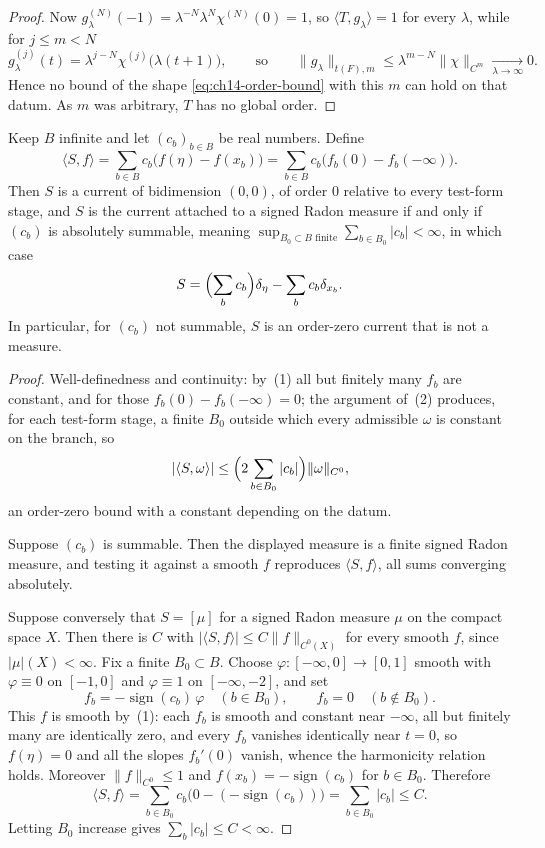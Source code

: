\begin{proof}
Now $g_\lambda^{(N)}(-1)=\lambda^{-N}\lambda^{N}\chi^{(N)}(0)=1$, so
$\langle T,g_\lambda\rangle=1$ for every $\lambda$, while for $j\le m<N$
\[
 g_\lambda^{(j)}(t)=\lambda^{j-N}\chi^{(j)}\bigl(\lambda(t+1)\bigr),
 \qquad\text{so}\qquad
 \|g_\lambda\|_{t(F),m}\le\lambda^{m-N}\|\chi\|_{C^m}
 \xrightarrow[\lambda\to\infty]{}0 .
\]
Hence no bound of the shape \eqref{eq:ch14-order-bound} with this $m$ can
hold on that datum.  As $m$ was arbitrary, $T$ has no global order.
\end{proof}

\begin{example}
\label{ex:ch14-star-not-measure}
Keep $B$ infinite and let $(c_b)_{b\in B}$ be real numbers.  Define
\[
 \langle S,f\rangle=\sum_{b\in B}c_b\bigl(f(\eta)-f(x_b)\bigr)
 =\sum_{b\in B}c_b\bigl(f_b(0)-f_b(-\infty)\bigr).
\]
Then $S$ is a current of bidimension $(0,0)$, of order $0$ relative to every
test-form stage, and $S$ is the current attached to a signed Radon measure if
and only if $(c_b)$ is absolutely summable, meaning
$\sup_{B_0\subset B\text{ finite}}\sum_{b\in B_0}|c_b|<\infty$,
in which case
\[
 S=\Bigl(\sum_bc_b\Bigr)\delta_\eta-\sum_bc_b\delta_{x_b}.
\]
In particular, for $(c_b)$ not summable, $S$ is an order-zero current that is
not a measure.
\end{example}

\begin{proof}
Well-definedness and continuity: by \,(1) all but
finitely many $f_b$ are constant, and for those
$f_b(0)-f_b(-\infty)=0$; the argument of
\,(2) produces, for each test-form stage, a
finite $B_0$ outside which every admissible $\omega$ is constant on the
branch, so
\[
 |\langle S,\omega\rangle|
 \le\Bigl(2\sum_{b\in B_0}|c_b|\Bigr)\|\omega\|_{C^0},
\]
an order-zero bound with a constant depending on the datum.

Suppose $(c_b)$ is summable.  Then the displayed measure is a finite signed
Radon measure, and testing it against a smooth $f$ reproduces
$\langle S,f\rangle$, all sums converging absolutely.

Suppose conversely that $S=[\mu]$ for a signed Radon measure $\mu$ on the
compact space $X$.  Then there is $C$ with $|\langle S,f\rangle|\le
C\|f\|_{C^0(X)}$ for every smooth $f$, since $|\mu|(X)<\infty$.  Fix a finite
$B_0\subset B$.  Choose $\varphi:[-\infty,0]\to[0,1]$ smooth with
$\varphi\equiv0$ on $[-1,0]$ and $\varphi\equiv1$ on $[-\infty,-2]$, and set
\[
 f_b=-\operatorname{sign}(c_b)\,\varphi\quad(b\in B_0),
 \qquad f_b=0\quad(b\notin B_0).
\]
This $f$ is smooth by \,(1): each $f_b$ is smooth
and constant near $-\infty$, all but finitely many are identically zero, and
every $f_b$ vanishes identically near $t=0$, so $f(\eta)=0$ and all the
slopes $f_b'(0)$ vanish, whence the harmonicity relation holds.  Moreover
$\|f\|_{C^0}\le1$ and $f(x_b)=-\operatorname{sign}(c_b)$ for $b\in B_0$.
Therefore
\[
 \langle S,f\rangle
 =\sum_{b\in B_0}c_b\bigl(0-(-\operatorname{sign}(c_b))\bigr)
 =\sum_{b\in B_0}|c_b|\le C .
\]
Letting $B_0$ increase gives $\sum_b|c_b|\le C<\infty$.
\end{proof}

